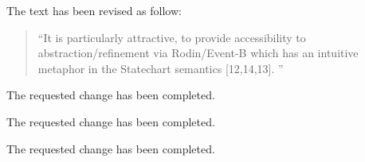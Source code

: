 \documentclass{response}
\begin{document}
\begin{comment}{Reviewer \#2}
- Page 2: line 5: "Particularly attractive is providing" --> "Particularly 
attractive in providing"
\end{comment}

\begin{response}
  The text has been revised as follow:
  \begin{quote}
    ``It is particularly attractive, to provide accessibility to abstraction/refinement via Rodin/Event-B 
    which has an intuitive metaphor in the Statechart semantics [12,14,13]. ''
  \end{quote}
\end{response}


\begin{comment}{Reviewer \#2}
- Page 2: line 10: "safety preservation" --> "safety properties preservation"
\end{comment}

\begin{response}
  The requested change has been completed.
\end{response}


\begin{comment}{Reviewer \#2}
- Page 2: line 20: "Preservation of safety" --> "Preservation of safety 
properties"
\end{comment}

\begin{response}
  The requested change has been completed.
\end{response}


\begin{comment}{Reviewer \#2}
- Page 2: line 45: "in the sense of [9]" --> "in the sense adopted by Lamport [9]"
\end{comment}

\begin{response}
  The requested change has been completed.
\end{response}
\end{document}
